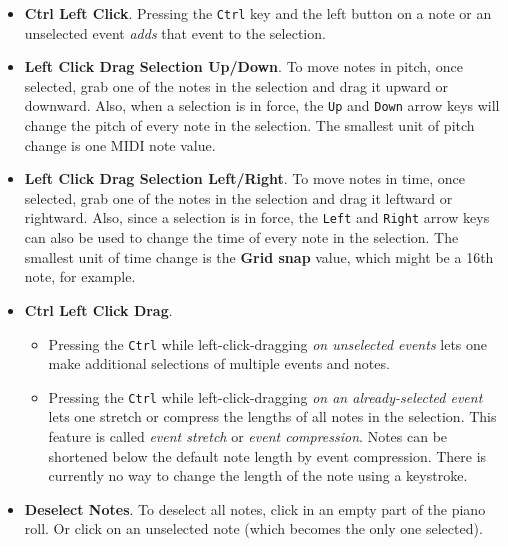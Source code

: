 \begin{itemize}
         the drag will change the length of
         \textsl{all of the notes in the selection}.
      \item {}
         \textbf{Ctrl Left Click}.
         Pressing the \texttt{Ctrl} key and the left button on a note or an
         unselected event \textsl{adds} that event to the selection.
      \item
         \textbf{Left Click Drag Selection Up/Down}.
         To move notes in pitch, once selected, grab one of the notes in the
         selection and drag it upward or downward.
         Also, when a selection is in force, the
         \texttt{Up} and \texttt{Down} arrow keys will
         change the pitch of every note in the selection.
         The smallest unit of pitch change is one MIDI note value.
      \item
         \textbf{Left Click Drag Selection Left/Right}.
         To move notes in time, once selected, grab one of the notes in the
         selection and drag it leftward or rightward.
         Also, since a selection is in force, the
         \texttt{Left} and \texttt{Right} arrow keys can also
         be used to change the time of every note in the selection.
         The smallest unit of time change is the \textbf{Grid snap} value,
         which might be a 16th note, for example.
      \item
         \textbf{Ctrl Left Click Drag}.
         \begin{itemize}
            \item Pressing the \texttt{Ctrl} while left-click-dragging
               \textsl{on unselected events} lets one make additional
               selections of multiple events and notes.
            \item Pressing the \texttt{Ctrl} while left-click-dragging
               \textsl{on an already-selected event} lets one stretch or
               compress the lengths of all notes in the selection.
               This feature is called \textsl{event stretch}
               or \textsl{event compression}.
               Notes can be shortened below the default note length by event
               compression.  There is currently no way to change the length of
               the note using a keystroke.
         \end{itemize}
      \item {} 
         \textbf{Deselect Notes}.
         To deselect all notes, click in an empty part of the piano roll.
         Or click on an unselected note (which becomes
         the only one selected).
   \end{itemize}

